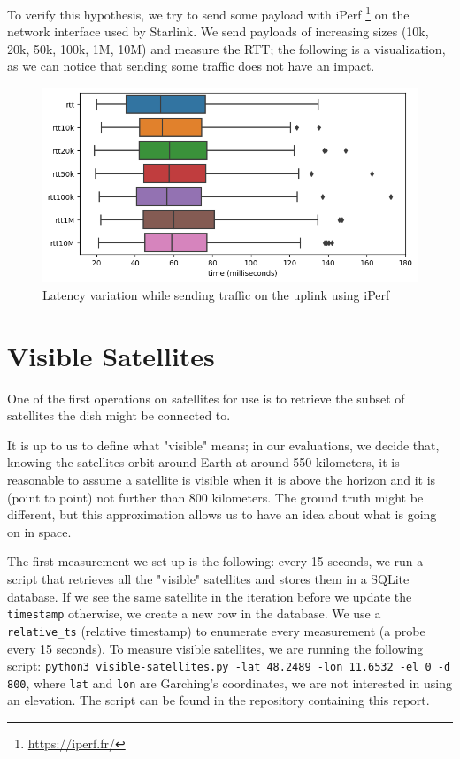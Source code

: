 \documentclass[IN,11pt,twoside,openright,idp,english]{tumthesis}
\begin{document}
To verify this hypothesis, we try to send some payload with iPerf \footnote{\url{https://iperf.fr/}} on the network interface used by Starlink. We send payloads of increasing sizes (10k, 20k, 50k, 100k, 1M, 10M) and measure the RTT; the following is a visualization, as we can notice that sending some traffic does not have an impact.

\begin{figure}
    \centering
    \includegraphics[width=0.6\columnwidth]{img/latency_iperf.png}
    \caption{Latency variation while sending traffic on the uplink using iPerf}
\end{figure}

\section{Visible Satellites}

One of the first operations on satellites for use is to retrieve the subset of satellites the dish might be connected to.

It is up to us to define what "visible" means; in our evaluations, we decide that, knowing the satellites orbit around Earth at around 550 kilometers, it is reasonable to assume a satellite is visible when it is above the horizon and it is (point to point) not further than 800 kilometers. The ground truth might be different, but this approximation allows us to have an idea about what is going on in space. 

The first measurement we set up is the following: every 15 seconds, we run a script that retrieves all the "visible" satellites and stores them in a SQLite database. If we see the same satellite in the iteration before we update the \texttt{timestamp} otherwise, we create a new row in the database. We use a \texttt{relative\_ts} (relative timestamp) to enumerate every measurement (a probe every 15 seconds). To measure visible satellites, we are running the following script: \texttt{python3 visible-satellites.py -lat 48.2489 -lon 11.6532 -el 0 -d 800}, where \texttt{lat} and \texttt{lon} are Garching's coordinates, we are not interested in using an elevation. The script can be found in the repository containing this report.
\end{document}
